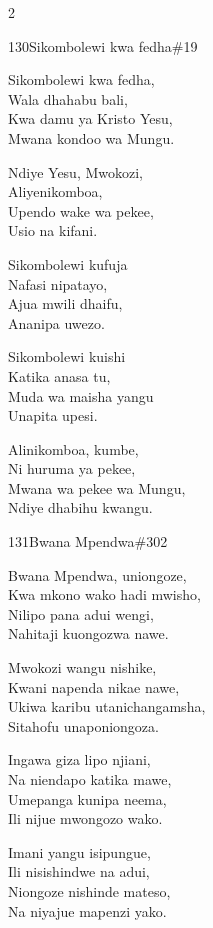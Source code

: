 \begin{multicols}{2}
\begin{hymn}{130}{Sikombolewi kwa fedha}{\#19}
\begin{stanza}
Sikombolewi kwa fedha,\\
Wala dhahabu bali,\\
Kwa damu ya Kristo Yesu,\\
Mwana kondoo wa Mungu.
\end{stanza}
\begin{chorus}
Ndiye Yesu, Mwokozi,\\
Aliyenikomboa,\\
Upendo wake wa pekee,\\
Usio na kifani.
\end{chorus}
\begin{stanza}
Sikombolewi kufuja\\
Nafasi nipatayo,\\
Ajua mwili dhaifu,\\
Ananipa uwezo.
\end{stanza}
\begin{stanza}
Sikombolewi kuishi\\
Katika anasa tu,\\
Muda wa maisha yangu\\
Unapita upesi.
\end{stanza}
\begin{stanza}
Alinikomboa, kumbe,\\
Ni huruma ya pekee,\\
Mwana wa pekee wa Mungu,\\
Ndiye dhabihu kwangu.
\end{stanza}
\end{hymn}

\begin{hymn}{131}{Bwana Mpendwa}{\#302}
\begin{stanza}
Bwana Mpendwa, uniongoze,\\
Kwa mkono wako hadi mwisho,\\
Nilipo pana adui wengi,\\
Nahitaji kuongozwa nawe.
\end{stanza}
\begin{chorus}
Mwokozi wangu nishike,\\
Kwani napenda nikae nawe,\\
Ukiwa karibu utanichangamsha,\\
Sitahofu unaponiongoza.
\end{chorus}
\begin{stanza}
Ingawa giza lipo njiani,\\
Na niendapo katika mawe,\\
Umepanga kunipa neema,\\
Ili nijue mwongozo wako.
\end{stanza}
\begin{stanza}
Imani yangu isipungue,\\
Ili nisishindwe na adui,\\
Niongoze nishinde mateso,\\
Na niyajue mapenzi yako.
\end{stanza}
\end{hymn}


\end{multicols}
